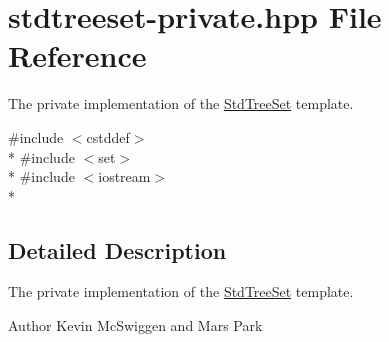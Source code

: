 \hypertarget{stdtreeset-private_8hpp}{\section{stdtreeset-\/private.hpp File Reference}
\label{stdtreeset-private_8hpp}
}


The private implementation of the \hyperlink{class_std_tree_set}{Std\-Tree\-Set} template.  


{\ttfamily \#include $<$cstddef$>$}\\*
{\ttfamily \#include $<$set$>$}\\*
{\ttfamily \#include $<$iostream$>$}\\*


\subsection{Detailed Description}
The private implementation of the \hyperlink{class_std_tree_set}{Std\-Tree\-Set} template. \begin{DoxyAuthor}{Author}
Kevin Mc\-Swiggen and Mars Park 
\end{DoxyAuthor}
